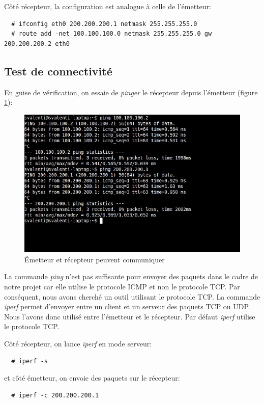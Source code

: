 \documentclass[a4paper]{article}
\begin{document}
Côté récepteur, la configuration est analogue à celle de l'émetteur:
\begin{verbatim}
  # ifconfig eth0 200.200.200.1 netmask 255.255.255.0
  # route add -net 100.100.100.0 netmask 255.255.255.0 gw 200.200.200.2 eth0
\end{verbatim}

\subsection{Test de connectivité}
En guise de vérification, on essaie de \textit{pinger} le
récepteur depuis l'émetteur (figure \ref{ping1}):

\begin{figure}[!ht]
	\centering
	\includegraphics[scale=.5]{ping.jpg}
	\caption{\label{ping1} Émetteur et récepteur peuvent communiquer}
\end{figure}

La commande \textit{ping} n'est pas suffisante pour envoyer
des paquets dans le cadre de notre projet car elle utilise
le protocole ICMP et non le protocole TCP. Par conséquent,
nous avons cherché un outil utilisant le protocole TCP.
La commande \textit{iperf} permet d'envoyer entre un client et
un serveur des paquets TCP ou UDP. Nous l'avons donc utilisé
entre l'émetteur et le récepteur. Par défaut \textit{iperf}
utilise le protocole TCP.

Côté récepteur, on lance \textit{iperf} en mode serveur:
\begin{verbatim}
  # iperf -s
\end{verbatim}

et côté émetteur, on envoie des paquets sur le récepteur:
\begin{verbatim}
  # iperf -c 200.200.200.1
\end{verbatim}
\end{document}
